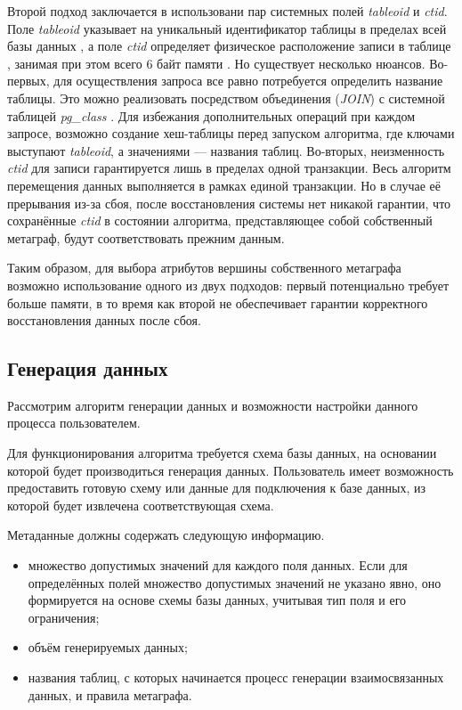 Второй подход заключается в использовани пар системных полей \textit{tableoid} и \textit{ctid}. Поле \textit{tableoid} указывает на уникальный идентификатор таблицы в пределах всей базы данных \cite{pg-tableoid}, а поле \textit{ctid} определяет физическое расположение записи в таблице \cite{pg-ctid}, занимая при этом всего 6 байт памяти \cite{pg-page-layout}. Но существует несколько нюансов. Во-первых, для осуществления запроса все равно потребуется определить название таблицы. Это можно реализовать посредством объединения (\textit{JOIN}) с системной таблицей \textit{pg\_class} \cite{pg-class}. Для избежания дополнительных операций при каждом запросе, возможно создание хеш-таблицы перед запуском алгоритма, где ключами выступают \textit{tableoid}, а значениями — названия таблиц. Во-вторых, неизменность \textit{ctid} для записи гарантируется лишь в пределах одной транзакции. Весь алгоритм перемещения данных выполняется в рамках единой транзакции. Но в случае её прерывания из-за сбоя, после восстановления системы нет никакой гарантии, что сохранённые \textit{ctid} в состоянии алгоритма, представляющее собой собственный метаграф, будут соответствовать прежним данным.

Таким образом, для выбора атрибутов вершины собственного метаграфа возможно использование одного из двух подходов: первый потенциально требует больше памяти, в то время как второй не обеспечивает гарантии корректного восстановления данных после сбоя.

\subsection{Генерация данных}
Рассмотрим алгоритм генерации данных и возможности настройки данного процесса пользователем.

Для функционирования алгоритма требуется схема базы данных, на основании которой будет производиться генерация данных. Пользователь имеет возможность предоставить готовую схему или данные для подключения к базе данных, из которой будет извлечена соответствующая схема.

Метаданные должны содержать следующую информацию.
\begin{itemize}
  \item множество допустимых значений для каждого поля данных. Если для определённых полей множество допустимых значений не указано явно, оно формируется на основе схемы базы данных, учитывая тип поля и его ограничения;
  \item объём генерируемых данных;
  \item названия таблиц, с которых начинается процесс генерации взаимосвязанных данных, и правила метаграфа.
\end{itemize}

